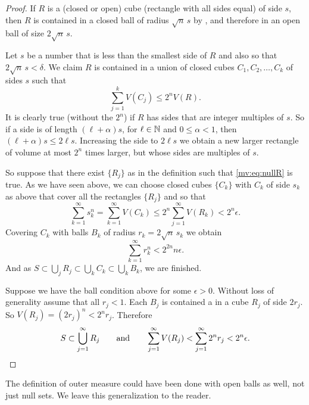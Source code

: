 \begin{proof}
If $R$ is a (closed or open) cube (rectangle with all sides
equal) of side $s$, then $R$ is contained in a closed ball of radius
$\sqrt{n}\, s$ by , and therefore
in an open ball of size $2 \sqrt{n}\, s$.

Let $s$ be a number that is less than the smallest side of $R$ and also
so that $2\sqrt{n} \, s < \delta$.
We claim $R$ is contained in
a union of closed cubes $C_1, C_2, \ldots, C_k$ of sides $s$ such that
\begin{equation*}
\sum_{j=1}^k V(C_j) \leq 2^n V(R) .
\end{equation*}
It is clearly true (without the $2^n$) if $R$ has sides that are
integer multiples of $s$.  So if a side is of length $(\ell+\alpha) s$, for
$\ell \in {\mathbb{N}}$ and $0 \leq \alpha < 1$, then
$(\ell+\alpha)s \leq 2\ell s$.  Increasing the side to $2\ell s$ we obtain a new larger
rectangle of volume at most $2^n$ times larger, but whose sides are
multiples of $s$.

So suppose that there exist $\{ R_j \}$ as in the definition such that
\eqref{mv:eq:nullR} is true.  As we have seen above, we can choose closed
cubes $\{ C_k \}$ with $C_k$ of side $s_k$ as above that cover all the rectangles $\{ R_j \}$
and so that
\begin{equation*}
\sum_{k=1}^\infty s_k^n =
\sum_{k=1}^\infty V(C_k) \leq
2^n \sum_{j=1}^\infty V(R_k)
< 2^n \epsilon.
\end{equation*}
Covering $C_k$ with balls $B_k$ of radius $r_k = 2\sqrt{n} \, s_k$ we obtain 
\begin{equation*}
\sum_{k=1}^\infty r_k^n <
2^{2n} n \epsilon .
\end{equation*}
And as $S \subset\bigcup_{j} R_j \subset \bigcup_{k} C_k \subset \bigcup_{k}
B_k$, we are finished.

Suppose we have the ball condition above for some $\epsilon > 0$.
Without loss of generality assume that all $r_j < 1$.
Each $B_j$ is contained a in a cube $R_j$ of side $2r_j$.
So $V(R_j) = {(2 r_j)}^n < 2^n r_j$.  Therefore 
\begin{equation*}
S \subset \bigcup_{j=1}^\infty R_j \qquad \text{and} \qquad
\sum_{j=1}^\infty V(R_j)
<
\sum_{j=1}^\infty 2^n r_j < 2^n \epsilon. \qedhere
\end{equation*}
\end{proof}

The definition of outer measure could have been done with open balls
as well, not just null sets.  We leave this generalization to the reader.

